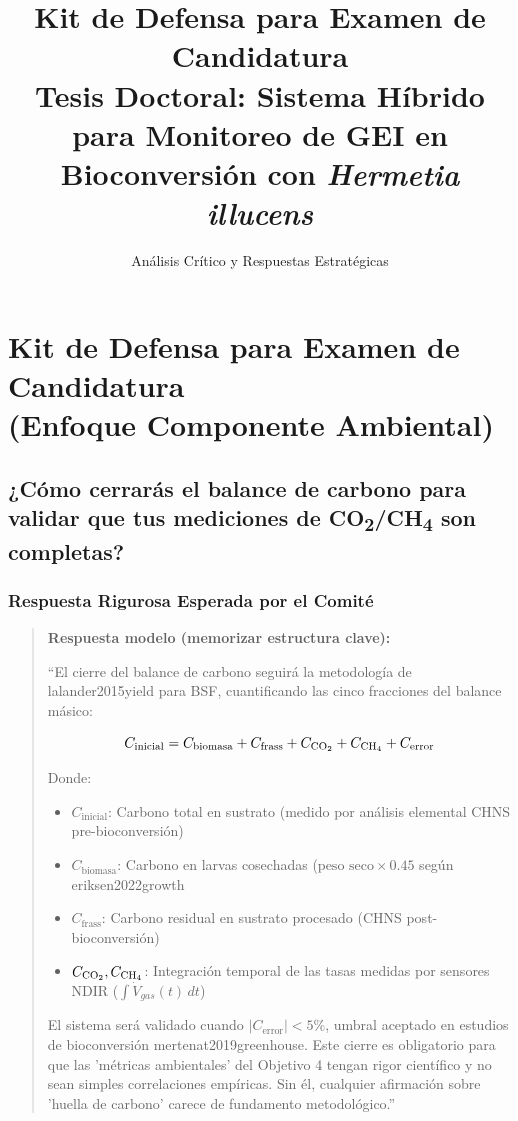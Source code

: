 \documentclass[12pt,oneside]{book}
\title{Kit de Defensa para Examen de Candidatura \\ Tesis Doctoral: Sistema Híbrido para Monitoreo de GEI en Bioconversión con \textit{Hermetia illucens}}
\author{Análisis Crítico y Respuestas Estratégicas}
\date{}
\begin{document}
\maketitle
\tableofcontents
\newpage

\chapter{Kit de Defensa para Examen de Candidatura \\ (Enfoque Componente Ambiental)}

\section{¿Cómo cerrarás el balance de carbono para validar que tus mediciones de CO\textsubscript{2}/CH\textsubscript{4} son completas?}

\subsection{Respuesta Rigurosa Esperada por el Comité}

\begin{quote}
\textbf{Respuesta modelo (memorizar estructura clave):}

``El cierre del balance de carbono seguirá la metodología de lalander2015yield para BSF, cuantificando las cinco fracciones del balance másico:

\begin{equation}
C_{\text{inicial}} = C_{\text{biomasa}} + C_{\text{frass}} + C_{\ce{CO2}} + C_{\ce{CH4}} + C_{\text{error}}
\end{equation}

Donde:
\begin{itemize}
    \item $C_{\text{inicial}}$: Carbono total en sustrato (medido por análisis elemental CHNS pre-bioconversión)
    \item $C_{\text{biomasa}}$: Carbono en larvas cosechadas ($\text{peso seco} \times 0.45$ según eriksen2022growth
    \item $C_{\text{frass}}$: Carbono residual en sustrato procesado (CHNS post-bioconversión)
    \item $C_{\ce{CO2}}, C_{\ce{CH4}}$: Integración temporal de las tasas medidas por sensores NDIR ($\int \dot{V}_{gas}(t) \, dt$)
\end{itemize}

El sistema será validado cuando $|C_{\text{error}}| < 5\%$, umbral aceptado en estudios de bioconversión mertenat2019greenhouse. Este cierre es obligatorio para que las 'métricas ambientales' del Objetivo 4 tengan rigor científico y no sean simples correlaciones empíricas. Sin él, cualquier afirmación sobre 'huella de carbono' carece de fundamento metodológico.''
\end{quote}
\end{document}
